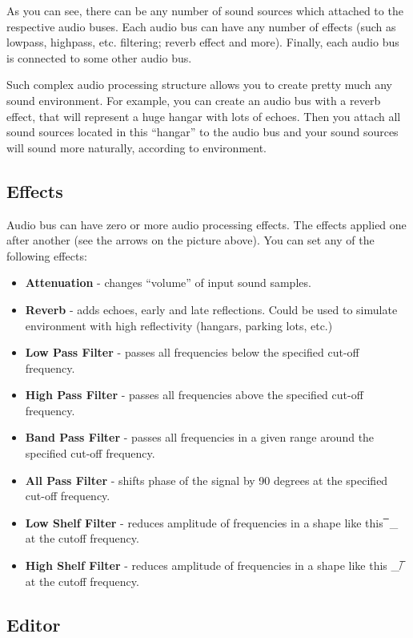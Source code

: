 \documentclass[
]{book}
\providecommand{\tightlist}{%
  \setlength{\itemsep}{0pt}\setlength{\parskip}{0pt}}
\theoremstyle{definition}
\theoremstyle{definition}
\theoremstyle{definition}
\theoremstyle{definition}
\theoremstyle{remark}
\begin{document}
As you can see, there can be any number of sound sources which attached to the respective audio buses. Each audio bus can have any number of effects (such as lowpass, highpass, etc. filtering; reverb effect and more). Finally, each audio bus is connected to some other audio bus.

Such complex audio processing structure allows you to create pretty much any sound environment. For example, you can create an audio bus with a reverb effect, that will represent a huge hangar with lots of echoes. Then you attach all sound sources located in this ``hangar'' to the audio bus and your sound sources will sound more naturally, according to environment.

\subsection{Effects}\label{effects}

Audio bus can have zero or more audio processing effects. The effects applied one after another (see the arrows on the picture above). You can set any of the following effects:

\begin{itemize}
\tightlist
\item
  \textbf{Attenuation} - changes ``volume'' of input sound samples.
\item
  \textbf{Reverb} - adds echoes, early and late reflections. Could be used to simulate environment with high reflectivity (hangars, parking lots, etc.)
\item
  \textbf{Low Pass Filter} - passes all frequencies below the specified cut-off frequency.
\item
  \textbf{High Pass Filter} - passes all frequencies above the specified cut-off frequency.
\item
  \textbf{Band Pass Filter} - passes all frequencies in a given range around the specified cut-off frequency.
\item
  \textbf{All Pass Filter} - shifts phase of the signal by 90 degrees at the specified cut-off frequency.
\item
  \textbf{Low Shelf Filter} - reduces amplitude of frequencies in a shape like this ̅ \_ at the cutoff frequency.
\item
  \textbf{High Shelf Filter} - reduces amplitude of frequencies in a shape like this \_/̅ at the cutoff frequency.
\end{itemize}

\subsection{Editor}\label{editor-1}
\end{document}
